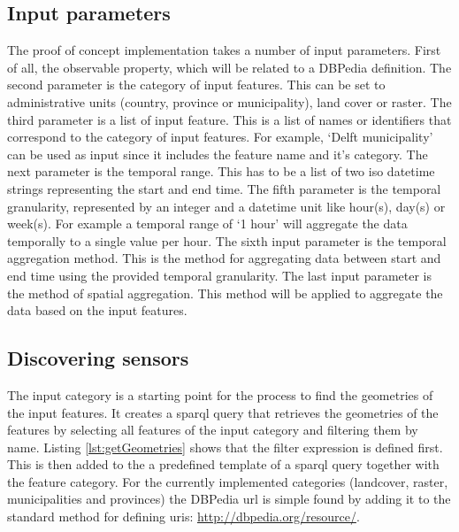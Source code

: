 \subsection{Input parameters}
The proof of concept implementation takes a number of input parameters. First of all, the observable property, which will be related to a DBPedia definition. The second parameter is the category of input features. This can be set to administrative units (country, province or municipality), land cover or raster. The third parameter is a list of input feature. This is a list of names or identifiers that correspond to the category of input features. For example, `Delft municipality' can be used as input since it includes the feature name and it's category. The next parameter is the temporal range. This has to be a list of two \ac{iso} datetime strings representing the start and end time. The fifth parameter is the temporal granularity, represented by an integer and a datetime unit like hour(s), day(s) or week(s). For example a temporal range of `1 hour' will aggregate the data temporally to a single value per hour. The sixth input parameter is the temporal aggregation method. This is the method for aggregating data between start and end time using the provided temporal granularity. The last input parameter is the method of spatial aggregation. This method will be applied to aggregate the data based on the input features.       

\subsection{Discovering sensors}
\label{par:discoverSensors}
The input category is a starting point for the process to find the geometries of the input features. It creates a \ac{sparql} query that retrieves the geometries of the features by selecting all features of the input category and filtering them by name. Listing \ref{lst:getGeometries} shows that the filter expression is defined first. This is then added to the a predefined template of a \ac{sparql} query together with the feature category. For the currently implemented categories (landcover, raster, municipalities and provinces) the DBPedia \ac{url} is simple found by adding it to the standard method for defining \acp{uri}: \url{http://dbpedia.org/resource/}.   


